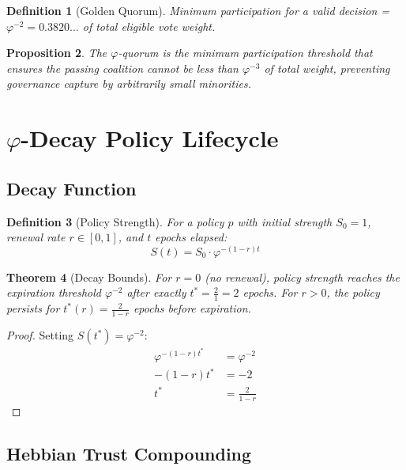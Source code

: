 \documentclass[11pt,twocolumn]{article}
\newtheorem{theorem}{Theorem}
\newtheorem{definition}[theorem]{Definition}
\newtheorem{proposition}[theorem]{Proposition}
\begin{document}
\begin{definition}[Golden Quorum]
Minimum participation for a valid decision = $\varphi^{-2} = 0.3820...$
of total eligible vote weight.
\end{definition}

\begin{proposition}
The $\varphi$-quorum is the minimum participation threshold that ensures
the passing coalition cannot be less than $\varphi^{-3}$ of total weight,
preventing governance capture by arbitrarily small minorities.
\end{proposition}

\section{$\varphi$-Decay Policy Lifecycle}

\subsection{Decay Function}

\begin{definition}[Policy Strength]
For a policy $p$ with initial strength $S_0 = 1$, renewal rate $r \in [0,1]$,
and $t$ epochs elapsed:
\begin{equation}
S(t) = S_0 \cdot \varphi^{-(1-r)t}
\end{equation}
\end{definition}

\begin{theorem}[Decay Bounds]
For $r = 0$ (no renewal), policy strength reaches the expiration threshold
$\varphi^{-2}$ after exactly $t^* = \frac{2}{1} = 2$ epochs. For $r > 0$,
the policy persists for $t^*(r) = \frac{2}{1-r}$ epochs before expiration.
\end{theorem}

\begin{proof}
Setting $S(t^*) = \varphi^{-2}$:
\begin{align}
\varphi^{-(1-r)t^*} &= \varphi^{-2} \\
-(1-r)t^* &= -2 \\
t^* &= \frac{2}{1-r}
\end{align}
\end{proof}

\subsection{Hebbian Trust Compounding}
\end{document}
